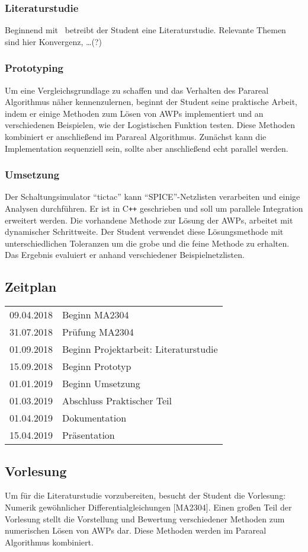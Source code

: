 \documentclass[12pt,a4paper]{article}
\begin{document}
\subsubsection*{Literaturstudie}
Beginnend mit~\cite{Gander:2015} betreibt der Student eine Literaturstudie. Relevante Themen sind hier Konvergenz, \ldots(?)
\subsubsection*{Prototyping}
Um eine Vergleichsgrundlage zu schaffen und das Verhalten des Parareal Algorithmus näher kennenzulernen, beginnt der Student seine praktische Arbeit, indem er einige Methoden zum Lösen von AWPs implementiert und an verschiedenen Beispielen, wie der Logistischen Funktion testen. Diese Methoden kombiniert er anschließend im Parareal Algorithmus. Zunächst kann die Implementation sequenziell sein, sollte aber anschließend echt parallel werden.
\subsubsection*{Umsetzung}
Der Schaltungsimulator "`tictac"' kann "`SPICE"'-Netzlisten verarbeiten und einige Analysen durchführen. Er ist in C\texttt{++} geschrieben und soll um parallele Integration erweitert werden. Die vorhandene Methode zur Lösung der AWPs, arbeitet mit dynamischer Schrittweite. Der Student verwendet diese Lösungsmethode mit unterschiedlichen Toleranzen um die grobe und die feine Methode zu erhalten. Das Ergebnis evaluiert er anhand verschiedener Beispielnetzlisten.

\subsection*{Zeitplan}

\begin{tabular}{ r l }
    09.04.2018 & Beginn MA2304\\
    31.07.2018 & Prüfung MA2304\\
    01.09.2018 & Beginn Projektarbeit: Literaturstudie\\
    15.09.2018 & Beginn Prototyp\\
    01.01.2019 & Beginn Umsetzung\\
    01.03.2019 & Abschluss Praktischer Teil\\
    01.04.2019 & Dokumentation\\
    15.04.2019 & Präsentation\\
  \end{tabular}

\subsection*{Vorlesung}

Um für die Literaturstudie vorzubereiten, besucht der Student die Vorlesung: Numerik gewöhnlicher Differentialgleichungen [MA2304]. Einen großen Teil der Vorlesung stellt die Vorstellung und Bewertung verschiedener Methoden zum numerischen Lösen von AWPs dar. Diese Methoden werden im Parareal Algorithmus kombiniert.



\end{document}
